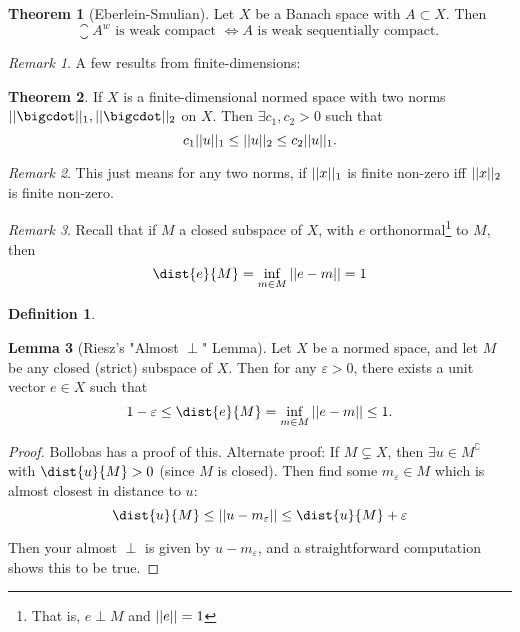 \documentclass[a5paper]{article}
\theoremstyle{definition}%
\newtheorem{theorem}{Theorem}
\newtheorem{lemma}[theorem]{Lemma}
\newtheorem*{definition*}{Definition}
\numberwithin{exercise}{section}
\theoremstyle{remark}%
\newtheorem*{remark*}{Remark}
\renewcommand{\epsilon}{\varepsilon}
\begin{document}
\begin{highlight}
\begin{theorem}[Eberlein-Smulian]
Let $X$ be a Banach space with $A\subset X$. Then 
$$\closure{A}^w\text{ is weak compact }\iff A\text{ is weak sequentially compact. }$$
\end{theorem}
\end{highlight}

\begin{remark*}
A few results from finite-dimensions: 
\end{remark*}

\begin{theorem}
If $X$ is a finite-dimensional normed space with two norms $\norm{\cdot}_1, \norm{\cdot}_2$ on $X$. Then $\exists c_1, c_2>0$ such that 
$$c_1 ||u||_1 \leq ||u||_2 \leq c_2||u||_1.$$
\end{theorem}
\begin{remark*}
This just means for any two norms, if $||x||_1$ is finite non-zero iff $||x||_2$ is finite non-zero.
\end{remark*}

\begin{remark*}
Recall that if $M$ a closed subspace of $X$, with $e$ orthonormal\footnote{That is, $e\perp M$ and $||e||=1$} to $M$, then 
$$\dist{e}{M}=\inf_{m\in M} \norm{e-m} = 1$$
\end{remark*}

\begin{definition*}

\end{definition*}

\begin{lemma}[Riesz's "Almost $\perp$" Lemma]
Let $X$ be a normed space, and let $M$ be any closed (strict) subspace of $X$. Then for any $\epsilon>0$, there exists a unit vector $e\in X$ such that 
$$1-\epsilon\leq \dist{e}{M}=\inf_{m\in M}\norm{e-m} \leq 1.$$
\end{lemma}
\begin{proof}
Bollobas has a proof of this. Alternate proof: If $M\subsetneq X$, then $\exists	u\in M^\complement$ with $\dist{u}{M}>0$ (since $M$ is closed). Then find some $m_\epsilon\in M$ which is almost closest in distance to $u$:
$$\dist{u}{M}\leq\norm{u-m_\epsilon}\leq\dist{u}{M}+\epsilon$$

Then your almost $\perp$ is given by $u-m_\epsilon$, and a straightforward computation shows this to be true. \qedhere
{}
\end{proof}
\end{document}
